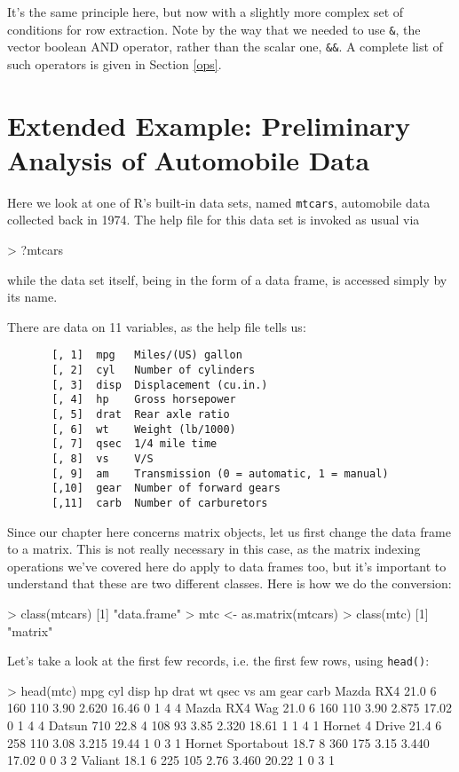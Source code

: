 It's the same principle here, but now with a slightly more complex set of
conditions for row extraction.  Note by the way that we needed to use
{\tt \&}, the vector boolean AND operator, rather than the scalar one,
{\tt \&\&}.  A complete list of such operators is given in Section
\ref{ops}.

\section{Extended Example:  Preliminary Analysis of Automobile Data}
\label{mtcars}

Here we look at one of R's built-in data sets, named {\tt mtcars},
automobile data collected back in 1974.  The help file for this data set
is invoked as usual via

\begin{Code}
> ?mtcars
\end{Code}

while the data set itself, being in the form of a data frame, is
accessed simply by its name.

There are data on 11 variables, as the help file tells us:

\begin{Verbatim}
       [, 1]  mpg   Miles/(US) gallon
       [, 2]  cyl   Number of cylinders
       [, 3]  disp  Displacement (cu.in.)
       [, 4]  hp    Gross horsepower
       [, 5]  drat  Rear axle ratio
       [, 6]  wt    Weight (lb/1000)
       [, 7]  qsec  1/4 mile time
       [, 8]  vs    V/S
       [, 9]  am    Transmission (0 = automatic, 1 = manual)
       [,10]  gear  Number of forward gears
       [,11]  carb  Number of carburetors
\end{Verbatim}

Since our chapter here concerns matrix objects, let us first change the
data frame to a matrix.  This is not really necessary in this case, as
the matrix indexing operations we've covered here do apply to data
frames too, but it's important to understand that these are two
different classes.  Here is how we do the conversion:

\begin{Code}
> class(mtcars)
[1] "data.frame"
> mtc <- as.matrix(mtcars)
> class(mtc)
[1] "matrix"
\end{Code}

Let's take a look at the first few records, i.e. the first few rows,
using {\tt head()}:

\begin{Code}
> head(mtc)
                   mpg cyl disp  hp drat    wt  qsec vs am gear carb
Mazda RX4         21.0   6  160 110 3.90 2.620 16.46  0  1    4    4
Mazda RX4 Wag     21.0   6  160 110 3.90 2.875 17.02  0  1    4    4
Datsun 710        22.8   4  108  93 3.85 2.320 18.61  1  1    4    1
Hornet 4 Drive    21.4   6  258 110 3.08 3.215 19.44  1  0    3    1
Hornet Sportabout 18.7   8  360 175 3.15 3.440 17.02  0  0    3    2
Valiant           18.1   6  225 105 2.76 3.460 20.22  1  0    3    1
\end{Code}

